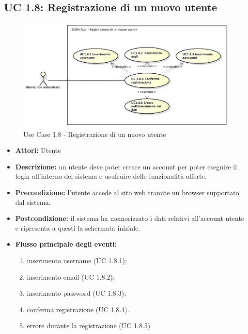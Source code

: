\clearpage


\subsection{UC 1.8: Registrazione di un nuovo utente}

\begin{figure}[!htbp]
    \centering
    \centerline{\includegraphics[scale=0.45]{./images/UC1_8.pdf}}
    \caption{Use Case 1.8 - Registrazione di un nuovo utente}
\end{figure}

\begin{itemize}
    \item \textbf{Attori:} Utente
    \item \textbf{Descrizione:} un utente deve poter creare un account per poter eseguire il login
    all’interno del sistema e usufruire delle funzionalità offerte.
    \item \textbf{Precondizione:} l'utente accede al sito web tramite un browser supportato
    dal sistema.
    \item \textbf{Postcondizione:} il sistema ha memorizzato i dati relativi all’account utente e
    ripresenta a questi la schermata iniziale.
    \item \textbf{Flusso principale degli eventi:}

    \begin{enumerate}
        \item inserimento username (UC 1.8.1);
        \item inserimento email (UC 1.8.2);
        \item inserimento password (UC 1.8.3);
        \item conferma registrazione (UC 1.8.4).
        \item errore durante la registrazione (UC 1.8.5)
    \end{enumerate}

\end{itemize}


